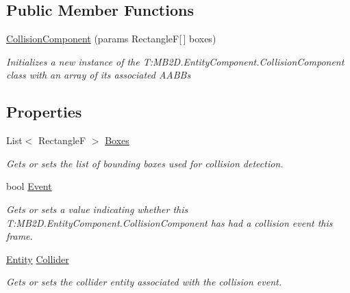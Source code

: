 \subsection*{Public Member Functions}
\begin{DoxyCompactItemize}
\item 
\hyperlink{class_m_b2_d_1_1_entity_component_1_1_collision_component_a6367fc81a9baf226bdd98cdc5814f5ac}{Collision\+Component} (params RectangleF\mbox{[}$\,$\mbox{]} boxes)
\begin{DoxyCompactList}\small\item\em Initializes a new instance of the T\+:\+M\+B2\+D.\+Entity\+Component.\+Collision\+Component class with an array of its associated A\+A\+BB\textquotesingle{}s \end{DoxyCompactList}\end{DoxyCompactItemize}
\subsection*{Properties}
\begin{DoxyCompactItemize}
\item 
List$<$ RectangleF $>$ \hyperlink{class_m_b2_d_1_1_entity_component_1_1_collision_component_a1cc63c601df7e30ce5b63e50b487dc9e}{Boxes}
\begin{DoxyCompactList}\small\item\em Gets or sets the list of bounding boxes used for collision detection. \end{DoxyCompactList}\item 
bool \hyperlink{class_m_b2_d_1_1_entity_component_1_1_collision_component_ad393ea9f0115ee346e469e5c335da26d}{Event}
\begin{DoxyCompactList}\small\item\em Gets or sets a value indicating whether this T\+:\+M\+B2\+D.\+Entity\+Component.\+Collision\+Component has had a collision event this frame. \end{DoxyCompactList}\item 
\hyperlink{class_m_b2_d_1_1_entity_component_1_1_entity}{Entity} \hyperlink{class_m_b2_d_1_1_entity_component_1_1_collision_component_aac8e61b6e669a4451fb2e8859827b47a}{Collider}
\begin{DoxyCompactList}\small\item\em Gets or sets the collider entity associated with the collision event. \end{DoxyCompactList}\end{DoxyCompactItemize}


